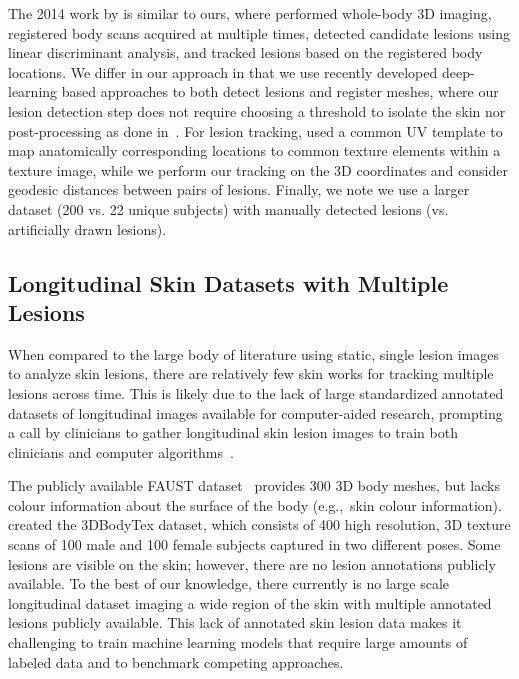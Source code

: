 \documentclass[journal]{IEEEtran}
\def\eg{e.g.,~}
\begin{document}
The 2014 work by \citet{Bogo2014a} is similar to ours, where \citet{Bogo2014a} performed whole-body 3D imaging, registered body scans acquired at multiple times, detected candidate lesions using linear discriminant analysis, and tracked lesions based on the registered body locations. We differ in our approach in that we use recently developed deep-learning based approaches to both detect lesions and register meshes, where our lesion detection step does not require choosing a threshold to isolate the skin nor post-processing as done in~\citet{Bogo2014a}. For lesion tracking, \citet{Bogo2014a} used a common UV template to map anatomically corresponding locations to common texture elements within a texture image, while we perform our tracking on the 3D coordinates and consider geodesic distances between pairs of lesions. Finally, we note we use a larger dataset (200 vs. 22 unique subjects) with manually detected lesions (vs. artificially drawn lesions).

\subsection{Longitudinal Skin Datasets with Multiple Lesions}
When compared to the large body of literature using static, single lesion images to analyze skin lesions, there are relatively few skin works for tracking multiple lesions across time. This is likely due to the lack of large standardized annotated datasets of longitudinal images available for computer-aided research, prompting a call by clinicians to gather longitudinal skin lesion images to train both clinicians and computer algorithms~\citep{Sondermann2019}.

The publicly available FAUST dataset~\citep{Bogo2014} provides 300 3D body meshes, but lacks colour information about the surface of the body (\eg skin colour information). \citet{Saint2018} created the 3DBodyTex dataset, which consists of 400 high resolution, 3D texture scans of 100 male and 100 female subjects captured in two different poses. Some lesions are visible on the skin; however, there are no lesion annotations publicly available. To the best of our knowledge, there currently is no large scale longitudinal dataset imaging a wide region of the skin with multiple annotated lesions publicly available. This lack of annotated skin lesion data makes it challenging to train machine learning models that require large amounts of labeled data and to benchmark competing approaches. 
\end{document}
